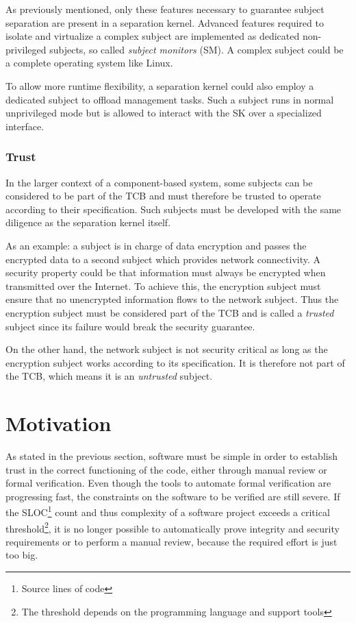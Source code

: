As previously mentioned, only these features necessary to guarantee subject
separation are present in a separation kernel. Advanced features required to
isolate and virtualize a complex subject are implemented as dedicated
non-privileged subjects, so called \emph{subject monitors} (SM). A
complex subject could be a complete operating system like Linux.

To allow more runtime flexibility, a separation kernel could also employ a
dedicated subject to offload management tasks. Such a subject runs in normal
unprivileged mode but is allowed to interact with the SK over a specialized
interface.

\subsubsection{Trust}
In the larger context of a component-based system, some subjects can be
considered to be part of the TCB and must therefore be trusted to operate
according to their specification. Such subjects must be developed with the same
diligence as the separation kernel itself.

As an example: a subject is in charge of data encryption and passes the
encrypted data to a second subject which provides network connectivity. A
security property could be that information must always be encrypted when
transmitted over the Internet. To achieve this, the encryption subject must
ensure that no unencrypted information flows to the network subject. Thus the
encryption subject must be considered part of the TCB and is called a
\emph{trusted} subject since its failure would break the security guarantee.

On the other hand, the network subject is not security critical as long as the
encryption subject works according to its specification. It is therefore not
part of the TCB, which means it is an \emph{untrusted} subject.

\section{Motivation}
As stated in the previous section, software must be simple in order to
establish trust in the correct functioning of the code, either through manual
review or formal verification. Even though the tools to automate formal
verification are progressing fast, the constraints on the software to be
verified are still severe. If the SLOC\footnote{Source lines of
code} count and thus complexity of a software project exceeds a
critical threshold\footnote{The threshold depends on the programming language
and support tools}, it is no longer possible to automatically prove integrity
and security requirements or to perform a manual review, because the required
effort is just too big.

